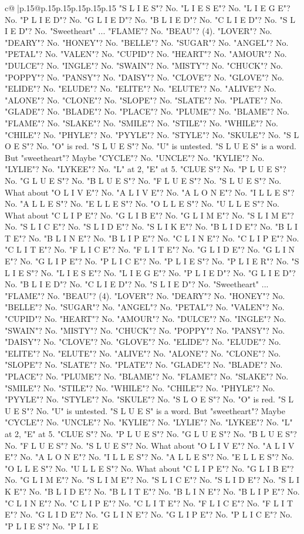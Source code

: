 \documentclass{article}
\begin{document}
{\begin{supertabular}{c@{$\;$}|p{.15\linewidth}@{}p{.15\linewidth}p{.15\linewidth}p{.15\linewidth}p{.15\linewidth}p{.15\linewidth}}
{{{"S L I E S"? No. "L I E S E"? No. "L I E G E"? No. "P L I E D"? No. "G L I E D"? No. "B L I E D"? No. "C L I E D"? No. "S L I E D"? No. "Sweetheart" ... "FLAME"? No. "BEAU"? (4). "LOVER"? No. "DEARY"? No. "HONEY"? No. "BELLE"? No. "SUGAR"? No. "ANGEL"? No. "PETAL"? No. "VALEN"? No. "CUPID"? No. "HEART"? No. "AMOUR"? No. "DULCE"? No. "INGLE"? No. "SWAIN"? No. "MISTY"? No. "CHUCK"? No. "POPPY"? No. "PANSY"? No. "DAISY"? No. "CLOVE"? No. "GLOVE"? No. "ELIDE"? No. "ELUDE"? No. "ELITE"? No. "ELUTE"? No. "ALIVE"? No. "ALONE"? No. "CLONE"? No. "SLOPE"? No. "SLATE"? No. "PLATE"? No. "GLADE"? No. "BLADE"? No. "PLACE"? No. "PLUME"? No. "BLAME"? No. "FLAME"? No. "SLAKE"? No. "SMILE"? No. "STILE"? No. "WHILE"? No. "CHILE"? No. "PHYLE"? No. "PYYLE"? No. "STYLE"? No. "SKULE"? No. "S L O E S"? No. "O" is red. "S L U E S"? No. "U" is untested. "S L U E S" is a word. But "sweetheart"? Maybe "CYCLE"? No. "UNCLE"? No. "KYLIE"? No. "LYLIE"? No. "LYKEE"? No. "L" at 2, "E" at 5. "CLUE S"? No. "P L U E S"? No. "G L U E S"? No. "B L U E S"? No. "F L U E S"? No. "S L U E S"? No. What about "O L I V E"? No. "A L I V E"? No. "A L O N E"? No. "I L L E S"? No. "A L L E S"? No. "E L L E S"? No. "O L L E S"? No. "U L L E S"? No. What about "C L I P E"? No. "G L I B E"? No. "G L I M E"? No. "S L I M E"? No. "S L I C E"? No. "S L I D E"? No. "S L I K E"? No. "B L I D E"? No. "B L I T E"? No. "B L I N E"? No. "B L I P E"? No. "C L I N E"? No. "C L I P E"? No. "C L I T E"? No. "F L I C E"? No. "F L I T E"? No. "G L I D E"? No. "G L I N E"? No. "G L I P E"? No. "P L I C E"? No. "P L I E S"? No. "P L I E R"? No. "S L I E S"? No. "L I E S E"? No. "L I E G E"? No. "P L I E D"? No. "G L I E D"? No. "B L I E D"? No. "C L I E D"? No. "S L I E D"? No. "Sweetheart" ... "FLAME"? No. "BEAU"? (4). "LOVER"? No. "DEARY"? No. "HONEY"? No. "BELLE"? No. "SUGAR"? No. "ANGEL"? No. "PETAL"? No. "VALEN"? No. "CUPID"? No. "HEART"? No. "AMOUR"? No. "DULCE"? No. "INGLE"? No. "SWAIN"? No. "MISTY"? No. "CHUCK"? No. "POPPY"? No. "PANSY"? No. "DAISY"? No. "CLOVE"? No. "GLOVE"? No. "ELIDE"? No. "ELUDE"? No. "ELITE"? No. "ELUTE"? No. "ALIVE"? No. "ALONE"? No. "CLONE"? No. "SLOPE"? No. "SLATE"? No. "PLATE"? No. "GLADE"? No. "BLADE"? No. "PLACE"? No. "PLUME"? No. "BLAME"? No. "FLAME"? No. "SLAKE"? No. "SMILE"? No. "STILE"? No. "WHILE"? No. "CHILE"? No. "PHYLE"? No. "PYYLE"? No. "STYLE"? No. "SKULE"? No. "S L O E S"? No. "O" is red. "S L U E S"? No. "U" is untested. "S L U E S" is a word. But "sweetheart"? Maybe "CYCLE"? No. "UNCLE"? No. "KYLIE"? No. "LYLIE"? No. "LYKEE"? No. "L" at 2, "E" at 5. "CLUE S"? No. "P L U E S"? No. "G L U E S"? No. "B L U E S"? No. "F L U E S"? No. "S L U E S"? No. What about "O L I V E"? No. "A L I V E"? No. "A L O N E"? No. "I L L E S"? No. "A L L E S"? No. "E L L E S"? No. "O L L E S"? No. "U L L E S"? No. What about "C L I P E"? No. "G L I B E"? No. "G L I M E"? No. "S L I M E"? No. "S L I C E"? No. "S L I D E"? No. "S L I K E"? No. "B L I D E"? No. "B L I T E"? No. "B L I N E"? No. "B L I P E"? No. "C L I N E"? No. "C L I P E"? No. "C L I T E"? No. "F L I C E"? No. "F L I T E"? No. "G L I D E"? No. "G L I N E"? No. "G L I P E"? No. "P L I C E"? No. "P L I E S"? No. "P L I E }}}
\end{supertabular}}
\end{document}

